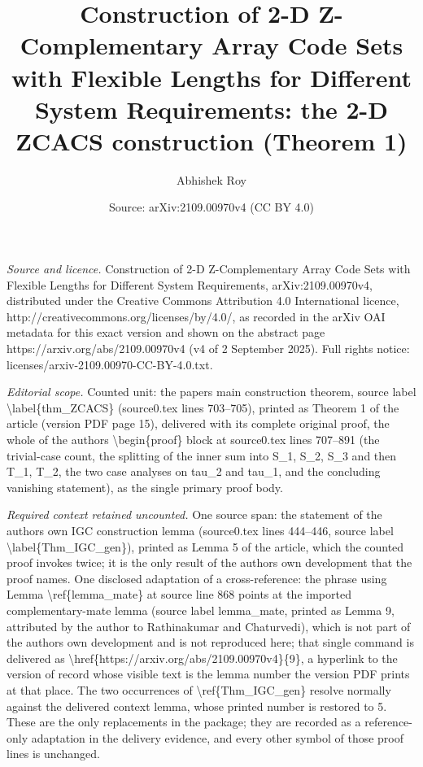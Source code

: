 \documentclass[10pt,a4paper]{amsart}
\title[Construction of 2-D Z-Complementary Array Code Sets with Flexible Lengths for Different System Requirements]{Construction of 2-D Z-Complementary Array Code Sets with Flexible Lengths for Different System Requirements: the 2-D ZCACS construction (Theorem 1)}
\author{Abhishek Roy}
\date{Source: arXiv:2109.00970v4 (CC BY 4.0)}
\theoremstyle{plain}
\begin{document}
\maketitle
\noindent\emph{Source and licence.} Construction of 2-D Z-Complementary Array Code Sets with Flexible Lengths for Different System Requirements, arXiv:2109.00970v4, distributed under the Creative Commons Attribution 4.0 International licence, http://creativecommons.org/licenses/by/4.0/, as recorded in the arXiv OAI metadata for this exact version and shown on the abstract page https://arxiv.org/abs/2109.00970v4 (v4 of 2 September 2025). Full rights notice: licenses/arxiv-2109.00970-CC-BY-4.0.txt.\par\smallskip
\noindent\textit{Editorial scope.} Counted unit: the paper\textquotesingle s main construction theorem, source label \textbackslash{}label\{thm\_ZCACS\} (source0.tex lines 703--705), printed as Theorem 1 of the article (version PDF page 15), delivered with its complete original proof, the whole of the author\textquotesingle s \textbackslash{}begin\{proof\} block at source0.tex lines 707--891 (the trivial-case count, the splitting of the inner sum into S\_1, S\_2, S\_3 and then T\_1, T\_2, the two case analyses on tau\_2 and tau\_1, and the concluding vanishing statement), as the single primary proof body.\par
\noindent\textit{Required context retained uncounted.} One source span: the statement of the author\textquotesingle s own IGC construction lemma (source0.tex lines 444--446, source label \textbackslash{}label\{Thm\_IGC\_gen\}), printed as Lemma 5 of the article, which the counted proof invokes twice; it is the only result of the author\textquotesingle s own development that the proof names. One disclosed adaptation of a cross-reference: the phrase using Lemma \textbackslash{}ref\{lemma\_mate\} at source line 868 points at the imported complementary-mate lemma (source label lemma\_mate, printed as Lemma 9, attributed by the author to Rathinakumar and Chaturvedi), which is not part of the author\textquotesingle s own development and is not reproduced here; that single command is delivered as \textbackslash{}href\{https://arxiv.org/abs/2109.00970v4\}\{9\}, a hyperlink to the version of record whose visible text is the lemma number the version PDF prints at that place. The two occurrences of \textbackslash{}ref\{Thm\_IGC\_gen\} resolve normally against the delivered context lemma, whose printed number is restored to 5. These are the only replacements in the package; they are recorded as a reference-only adaptation in the delivery evidence, and every other symbol of those proof lines is unchanged.\par
\end{document}
